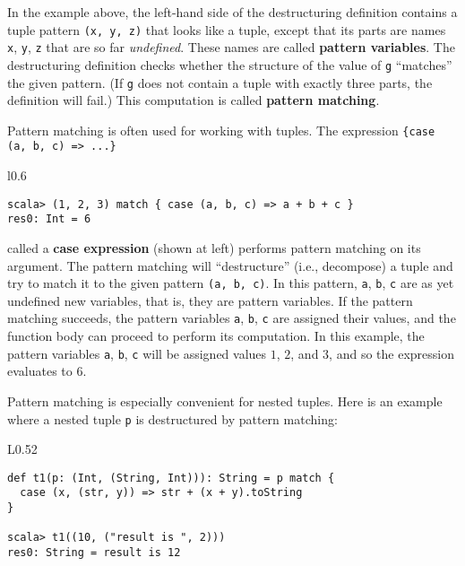In the example above, the left-hand side of the destructuring definition
contains a tuple pattern \lstinline!(x, y, z)! that looks like a
tuple, except that its parts are names \lstinline!x!, \lstinline!y!,
\lstinline!z! that are so far \emph{undefined}. These names are called
\textbf{pattern variables}. The destructuring
definition checks whether the structure of the value of \lstinline!g!
\textsf{``}matches\textsf{''} the given pattern. (If \lstinline!g! does not contain
a tuple with exactly three parts, the definition will fail.) This
computation is called \textbf{pattern matching}.

Pattern matching is often used for working with tuples. The expression
\lstinline!{case (a, b, c) => ...}!\begin{wrapfigure}{l}{0.6\columnwidth}%
\vspace{-0.7\baselineskip}
\begin{lstlisting}
scala> (1, 2, 3) match { case (a, b, c) => a + b + c }
res0: Int = 6
\end{lstlisting}
\vspace{-1.5\baselineskip}
\end{wrapfigure}%
called a \textbf{case expression}
(shown at left) performs pattern matching on its argument. The pattern
matching will \textsf{``}destructure\textsf{''} (i.e., decompose) a tuple and try
to match it to the given pattern \lstinline!(a, b, c)!. In this pattern,
\lstinline!a!, \lstinline!b!, \lstinline!c! are as yet undefined
new variables, \textemdash{} that is, they are pattern
variables. If the pattern matching succeeds, the pattern variables
\lstinline!a!, \lstinline!b!, \lstinline!c! are assigned their
values, and the function body can proceed to perform its computation.
In this example, the pattern variables \lstinline!a!, \lstinline!b!,
\lstinline!c! will be assigned values $1$, $2$, and $3$, and so
the expression evaluates to $6$.

Pattern matching is especially convenient for nested tuples. Here
is an example where a nested tuple \lstinline!p! is destructured
by pattern matching:\hfill{}~\begin{wrapfigure}{L}{0.52\columnwidth}%
\vspace{-0.8\baselineskip}
\begin{lstlisting}
def t1(p: (Int, (String, Int))): String = p match {
  case (x, (str, y)) => str + (x + y).toString
}

scala> t1((10, ("result is ", 2)))
res0: String = result is 12
\end{lstlisting}
\vspace{-1.5\baselineskip}
\end{wrapfigure}%
\textbf{ }

